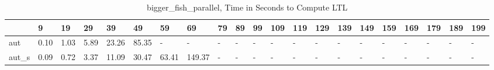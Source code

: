 \begin{table}
\caption{bigger_fish_parallel, Time in Seconds to Compute LTL}
\label{bigger_fish_parallel_LTL_time}
\begin{tabular}{lllllllllllllllllllll}
\toprule
 & 9 & 19 & 29 & 39 & 49 & 59 & 69 & 79 & 89 & 99 & 109 & 119 & 129 & 139 & 149 & 159 & 169 & 179 & 189 & 199 \\
\midrule
aut & 0.10 & 1.03 & 5.89 & 23.26 & 85.35 & - & - & - & - & - & - & - & - & - & - & - & - & - & - & - \\
aut_s & 0.09 & 0.72 & 3.37 & 11.09 & 30.47 & 63.41 & 149.37 & - & - & - & - & - & - & - & - & - & - & - & - & - \\
\bottomrule
\end{tabular}
\end{table}
